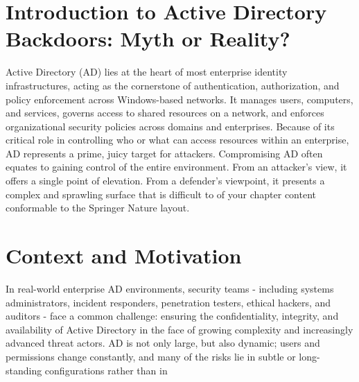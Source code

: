 
\section{Introduction to Active Directory Backdoors: Myth or Reality?}

Active Directory (AD) lies at the heart of most enterprise identity infrastructures, acting as the cornerstone of authentication, authorization, and policy enforcement across Windows-based networks. It manages users, computers, and services, governs access to shared resources on a network, and enforces organizational security policies across domains and enterprises. Because of its critical role in controlling who or what can access resources within an enterprise, AD represents a prime, juicy target for attackers. Compromising AD often equates to gaining control of the entire environment. From an attacker's view, it offers a single point of elevation. From a defender's viewpoint, it presents a complex and sprawling surface that is difficult to of your chapter content conformable to the Springer Nature layout.
\section{Context and Motivation}
In real-world enterprise AD environments, security teams - including systems administrators, incident responders, penetration testers, ethical hackers, and auditors - face a common challenge: ensuring the confidentiality, integrity, and availability of Active Directory in the face of growing complexity and increasingly advanced threat actors. AD is not only large, but also dynamic; users and permissions change constantly, and many of the risks lie in subtle or long-standing configurations rather than in 